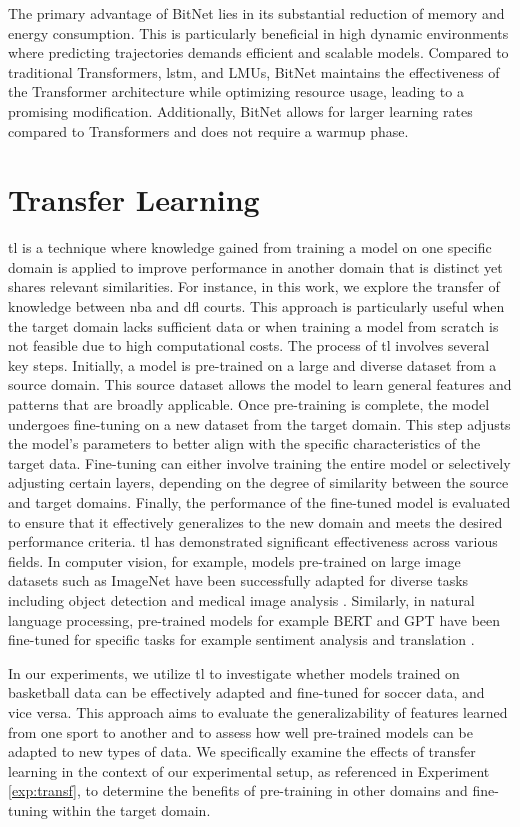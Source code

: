 The primary advantage of BitNet lies in its substantial reduction of memory and energy consumption. This is particularly beneficial in high dynamic environments where predicting trajectories demands efficient and scalable models. Compared to traditional Transformers, \gls{lstm}, and LMUs, BitNet maintains the effectiveness of the Transformer architecture while optimizing resource usage, leading to a promising modification. Additionally, BitNet allows for larger learning rates compared to Transformers and does not require a warmup phase.

\section{Transfer Learning}
\label{sect:transfer-learning}

\gls{tl} is a technique where knowledge gained from training a model on one specific domain is applied to improve performance in another domain that is distinct yet shares relevant similarities. For instance, in this work, we explore the transfer of knowledge between \gls{nba} and \gls{dfl} courts. This approach is particularly useful when the target domain lacks sufficient data or when training a model from scratch is not feasible due to high computational costs. The process of \gls{tl} involves several key steps. Initially, a model is pre-trained on a large and diverse dataset from a source domain. This source dataset allows the model to learn general features and patterns that are broadly applicable. Once pre-training is complete, the model undergoes fine-tuning on a new dataset from the target domain. This step adjusts the model's parameters to better align with the specific characteristics of the target data. Fine-tuning can either involve training the entire model or selectively adjusting certain layers, depending on the degree of similarity between the source and target domains. Finally, the performance of the fine-tuned model is evaluated to ensure that it effectively generalizes to the new domain and meets the desired performance criteria. \gls{tl} has demonstrated significant effectiveness across various fields. In computer vision, for example, models pre-trained on large image datasets such as ImageNet have been successfully adapted for diverse tasks including object detection and medical image analysis \cite{pan2009survey, GoodBengCour16}. Similarly, in natural language processing, pre-trained models for example BERT and GPT have been fine-tuned for specific tasks for example sentiment analysis and translation \cite{bert, radford2019language}.

In our experiments, we utilize \gls{tl} to investigate whether models trained on basketball data can be effectively adapted and fine-tuned for soccer data, and vice versa. This approach aims to evaluate the generalizability of features learned from one sport to another and to assess how well pre-trained models can be adapted to new types of data. We specifically examine the effects of transfer learning in the context of our experimental setup, as referenced in Experiment \ref{exp:transf}, to determine the benefits of pre-training in other domains and fine-tuning within the target domain.
